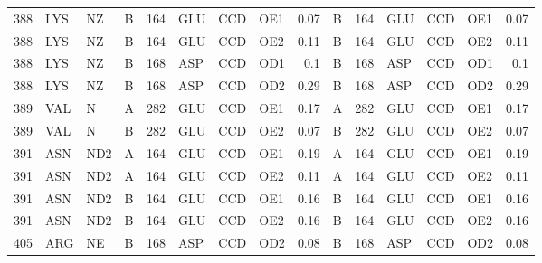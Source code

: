 \begin{longtable}{rlllrlllrlrlllr}
       388 & LYS        & NZ     & B         &         164 & GLU          & CCD         & OE1      &          0.07 & B         &         164 & GLU          & CCD         & OE1      &          0.07 \\
       388 & LYS        & NZ     & B         &         164 & GLU          & CCD         & OE2      &          0.11 & B         &         164 & GLU          & CCD         & OE2      &          0.11 \\
       388 & LYS        & NZ     & B         &         168 & ASP          & CCD         & OD1      &          0.1  & B         &         168 & ASP          & CCD         & OD1      &          0.1  \\
       388 & LYS        & NZ     & B         &         168 & ASP          & CCD         & OD2      &          0.29 & B         &         168 & ASP          & CCD         & OD2      &          0.29 \\
       389 & VAL        & N      & A         &         282 & GLU          & CCD         & OE1      &          0.17 & A         &         282 & GLU          & CCD         & OE1      &          0.17 \\
       389 & VAL        & N      & B         &         282 & GLU          & CCD         & OE2      &          0.07 & B         &         282 & GLU          & CCD         & OE2      &          0.07 \\
       391 & ASN        & ND2    & A         &         164 & GLU          & CCD         & OE1      &          0.19 & A         &         164 & GLU          & CCD         & OE1      &          0.19 \\
       391 & ASN        & ND2    & A         &         164 & GLU          & CCD         & OE2      &          0.11 & A         &         164 & GLU          & CCD         & OE2      &          0.11 \\
       391 & ASN        & ND2    & B         &         164 & GLU          & CCD         & OE1      &          0.16 & B         &         164 & GLU          & CCD         & OE1      &          0.16 \\
       391 & ASN        & ND2    & B         &         164 & GLU          & CCD         & OE2      &          0.16 & B         &         164 & GLU          & CCD         & OE2      &          0.16 \\
       405 & ARG        & NE     & B         &         168 & ASP          & CCD         & OD2      &          0.08 & B         &         168 & ASP          & CCD         & OD2      &          0.08 \\

\end{longtable}
